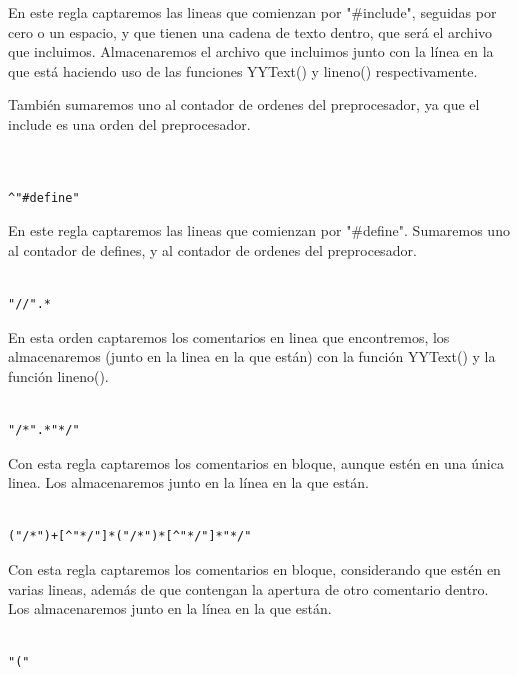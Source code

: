 \documentclass[12pt, spanish]{article}
\begin{document}
En este regla captaremos las lineas que comienzan por "\#include", seguidas por cero o un espacio, y que tienen una cadena de texto dentro, que será el archivo que incluimos. Almacenaremos el archivo que incluimos junto con la línea en la que está haciendo uso de las funciones YYText() y lineno() respectivamente.

También sumaremos uno al contador de ordenes del preprocesador, ya que el include es una orden del preprocesador.


\begin{verbatim}


^"#define"

\end{verbatim}

En este regla captaremos las lineas que comienzan por "\#define". Sumaremos uno al contador de defines, y al contador de ordenes del preprocesador.


\begin{verbatim}

"//".*	

\end{verbatim}

En esta orden captaremos los comentarios en linea que encontremos, los almacenaremos (junto en la linea en la que están) con la función YYText() y la función lineno().




\begin{verbatim}

"/*".*"*/"

\end{verbatim}

Con esta regla captaremos los comentarios en bloque, aunque estén en una única linea. Los almacenaremos junto en la línea en la que están.


\begin{verbatim}

("/*")+[^"*/"]*("/*")*[^"*/"]*"*/"

\end{verbatim}

Con esta regla captaremos los comentarios en bloque, considerando que estén en varias lineas, además de que contengan la apertura de otro comentario dentro. Los almacenaremos junto en la línea en la que están.


\begin{verbatim}

"("

\end{verbatim}
\end{document}
